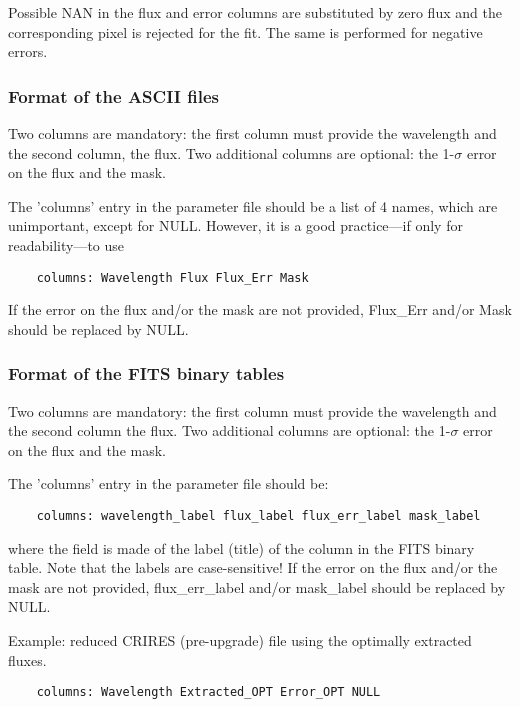 Possible {\sc NAN} in the flux and error columns are substituted by zero flux
and the corresponding pixel is rejected for the fit. The same is performed for
negative errors.


\subsubsection{Format of the ASCII files}\label{sec:inputspec_ascii}
Two columns are mandatory: the first column must provide the wavelength and the
second column, the flux. Two additional columns are optional: the 1-\(\sigma\)
error on the flux and the mask.

The 'columns' entry in the parameter file should be a list of 4 names, which are
unimportant, except for {\sc NULL}.  However, it is a good practice---if only
for readability---to use
\begin{verbatim}
	columns: Wavelength Flux Flux_Err Mask
\end{verbatim}

If the error on the flux and/or the mask are not provided, {\sc Flux\_Err}
and/or {\sc Mask} should be replaced by {\sc NULL}.

\subsubsection{Format of the FITS binary tables}\label{sec:inputspec_bintable}
Two columns are mandatory: the first column must provide the wavelength and the
second column the flux. Two additional columns are optional: the 1-\(\sigma\)
error on the flux and  the mask.

The 'columns' entry in the parameter file should be:
\begin{verbatim}
	columns: wavelength_label flux_label flux_err_label mask_label
\end{verbatim}
where the field is made of the label (title) of the column in the FITS binary
table. Note that the labels are case-sensitive! If the error on the flux and/or
the mask are not provided, {\sc flux\_err\_label} and/or {\sc mask\_label}
should be replaced by {\sc NULL}.

Example: reduced CRIRES (pre-upgrade) file using the optimally extracted fluxes.
\begin{verbatim}
	columns: Wavelength Extracted_OPT Error_OPT NULL
\end{verbatim}

